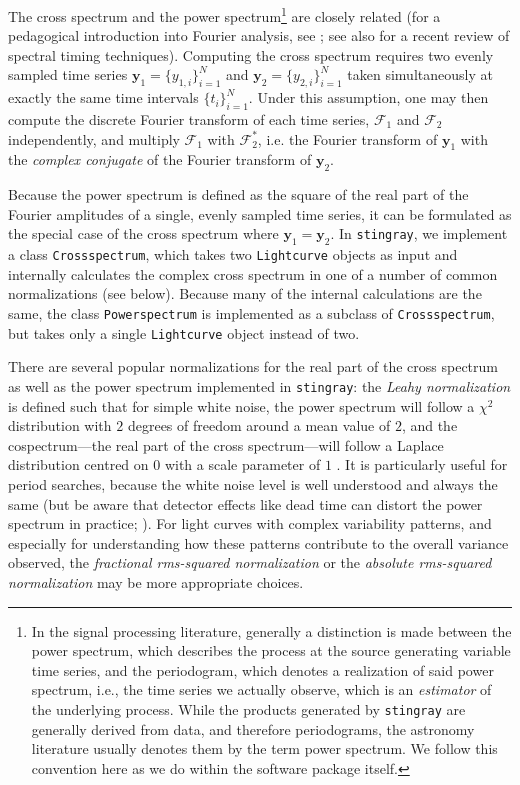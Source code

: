 \documentclass[twocolumn]{aastex62}
\newcommand{\stingray}{\texttt{stingray}\xspace}
\newcommand{\lightcurve}{\texttt{Lightcurve}\xspace}
\newcommand{\crossspectrum}{\texttt{Crossspectrum}\xspace}
\newcommand{\powerspectrum}{\texttt{Powerspectrum}\xspace}
\begin{document}
The cross spectrum and the power spectrum\footnote{In the signal processing literature, generally a distinction is made between the power spectrum, which
describes the process at the source generating variable time series, and the periodogram, which denotes a realization of said power spectrum, i.e., the time series we actually observe, which is an \textit{estimator} of the underlying process. While the products generated by \stingray are generally derived from data, and therefore periodograms, the astronomy literature usually denotes them by the term power spectrum. We follow this convention here as we do within the software package itself.} 
are closely related (for a pedagogical introduction into Fourier analysis, see \citealt{vanderklis1989}; see also \citealt{uttley2014} for a recent review of spectral timing techniques). 
Computing the cross spectrum requires two evenly sampled time series $\mathbf{y}_1 = \{y_{1,i}\}_{i=1}^{N} $ and $\mathbf{y}_2 =  \{y_{2,i}\}_{i=1}^{N}$ taken simultaneously at exactly the same time intervals $\{t_i \}_{i=1}^N$. 
Under this assumption, one may then compute the discrete Fourier transform of each time series, $\mathcal{F}_1$ and $\mathcal{F}_2$ independently, and multiply $\mathcal{F}_1$ with $\mathcal{F}^{*}_2$, i.e. the Fourier transform of $\mathbf{y}_1$ with the \textit{complex conjugate} of the Fourier transform of $\mathbf{y}_2$. 

Because the power spectrum is defined as the square of the real part of the Fourier amplitudes of a single, evenly sampled time series, it can be formulated as the special case of the cross spectrum where $\mathbf{y}_1 = \mathbf{y}_2$. 
In \stingray, we implement a class \crossspectrum, which takes two \lightcurve objects as input and internally calculates the complex cross spectrum in one of a number of common normalizations (see below).  Because many of the internal calculations are the same, the class \powerspectrum is implemented as a subclass of \crossspectrum, but takes only a single \lightcurve object instead of two. 

There are several popular normalizations for the real part of the cross spectrum as well as the power spectrum implemented in \stingray: the \textit{Leahy normalization} \citep{leahy1983} is defined such that for simple white noise, the power spectrum will follow a $\chi^2$ distribution with $2$ degrees of freedom around a mean value of $2$, and the cospectrum---the real part of the cross spectrum---will follow a Laplace distribution centred on $0$ with a scale parameter of $1$ \citep{huppenkothen2017}. It is particularly useful for period searches, because the white noise level is well understood and always the same (but be aware that detector effects like dead time can distort the power spectrum in practice; \citealt{Bachetti+15}).
For light curves with complex variability patterns, and especially for understanding how these patterns contribute to the overall variance observed, the \textit{fractional rms-squared normalization} \citep{belloni1990,miyamoto1992}  or the \textit{absolute rms-squared normalization} \citep{uttley2001} may be more appropriate choices. 
\end{document}
